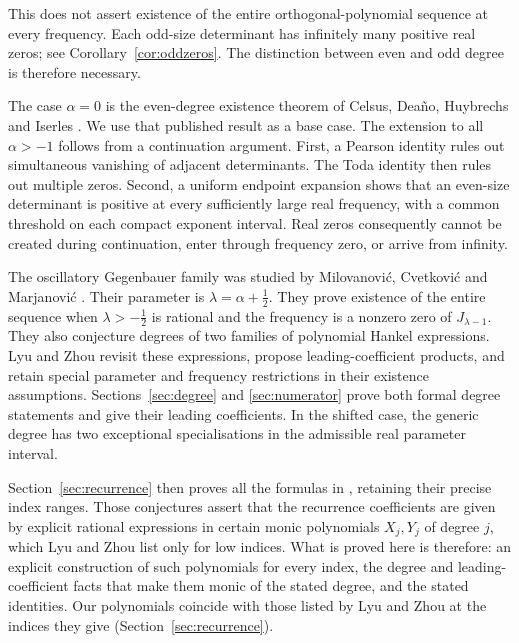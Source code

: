 \documentclass[11pt]{article}
\numberwithin{equation}{section}
\theoremstyle{remark}
\begin{document}
This does not assert existence of the entire orthogonal-polynomial sequence
at every frequency. Each odd-size determinant has infinitely many positive
real zeros; see Corollary~\ref{cor:oddzeros}. The distinction between even
and odd degree is therefore necessary.

The case $\alpha=0$ is the even-degree existence theorem of
Celsus, Dea\~no, Huybrechs and Iserles
\cite[Theorem~4.3]{Celsus2022}. We use that published result as a base
case. The extension to all $\alpha>-1$ follows from a continuation
argument. First, a Pearson identity rules out simultaneous vanishing of
adjacent determinants. The Toda identity then rules out multiple zeros.
Second, a uniform endpoint expansion shows that an even-size determinant
is positive at every sufficiently large real frequency, with a common
threshold on each compact exponent interval. Real zeros consequently
cannot be created during continuation, enter through frequency zero, or
arrive from infinity.

The oscillatory Gegenbauer family was studied by Milovanovi\'c,
Cvetkovi\'c and Marjanovi\'c \cite{MCM2008}. Their parameter is
$\lambda=\alpha+\tfrac12$. They prove existence of the entire sequence
when $\lambda>-\tfrac12$ is rational and the frequency is a nonzero zero
of $J_{\lambda-1}$. They also conjecture degrees of two families of
polynomial Hankel expressions. Lyu and Zhou \cite{LyuZhou2026} revisit
these expressions, propose leading-coefficient products, and retain special
parameter and frequency restrictions in their existence assumptions.
Sections~\ref{sec:degree} and \ref{sec:numerator} prove both formal degree
statements and give their leading coefficients. In the shifted case,
the generic degree has two exceptional specialisations in the admissible
real parameter interval.

Section~\ref{sec:recurrence} then proves all the formulas in
\cite[Conjectures~2.5 and 2.7]{LyuZhou2026}, retaining their precise
index ranges. Those conjectures assert that the recurrence coefficients
are given by explicit rational expressions in certain monic polynomials
$X_j,Y_j$ of degree $j$, which Lyu and Zhou list only for low indices.
What is proved here is therefore: an explicit construction of such
polynomials for every index, the degree and leading-coefficient facts
that make them monic of the stated degree, and the stated identities.
Our polynomials coincide with those listed by Lyu and Zhou at the
indices they give (Section~\ref{sec:recurrence}).
\end{document}
